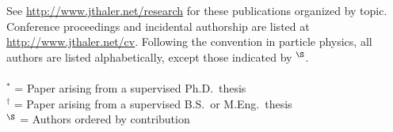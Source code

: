 See \url{http://www.jthaler.net/research} for these publications organized by topic.  Conference proceedings and incidental authorship are listed at \url{http://www.jthaler.net/cv}.  Following the convention in particle physics, all authors are listed alphabetically, except those indicated by ${}^\S$. \\
~\\
\noindent ${}^\ast$ = Paper arising from a supervised Ph.D.\ thesis\\
\noindent ${}^\dagger$ = Paper arising from a supervised B.S.\ or M.Eng.\ thesis\\
\noindent ${}^\S$ = Authors ordered by contribution\\
